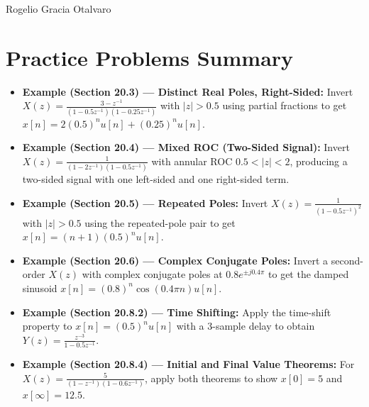 \documentclass[11pt]{article}
\begin{document}
Rogelio Gracia Otalvaro

\section*{Practice Problems Summary}

\begin{itemize}
  \item \textbf{Example (Section 20.3) — Distinct Real Poles, Right-Sided:} Invert $X(z) = \frac{3 - z^{-1}}{(1 - 0.5 z^{-1})(1 - 0.25 z^{-1})}$ with $|z| > 0.5$ using partial fractions to get $x[n] = 2(0.5)^n u[n] + (0.25)^n u[n]$.
  \item \textbf{Example (Section 20.4) — Mixed ROC (Two-Sided Signal):} Invert $X(z) = \frac{1}{(1 - 2 z^{-1})(1 - 0.5 z^{-1})}$ with annular ROC $0.5 < |z| < 2$, producing a two-sided signal with one left-sided and one right-sided term.
  \item \textbf{Example (Section 20.5) — Repeated Poles:} Invert $X(z) = \frac{1}{(1 - 0.5 z^{-1})^2}$ with $|z| > 0.5$ using the repeated-pole pair to get $x[n] = (n+1)(0.5)^n u[n]$.
  \item \textbf{Example (Section 20.6) — Complex Conjugate Poles:} Invert a second-order $X(z)$ with complex conjugate poles at $0.8 e^{\pm j 0.4\pi}$ to get the damped sinusoid $x[n] = (0.8)^n \cos(0.4\pi n) u[n]$.
  \item \textbf{Example (Section 20.8.2) — Time Shifting:} Apply the time-shift property to $x[n] = (0.5)^n u[n]$ with a 3-sample delay to obtain $Y(z) = \frac{z^{-3}}{1 - 0.5 z^{-1}}$.
  \item \textbf{Example (Section 20.8.4) — Initial and Final Value Theorems:} For $X(z) = \frac{5}{(1 - z^{-1})(1 - 0.6 z^{-1})}$, apply both theorems to show $x[0] = 5$ and $x[\infty] = 12.5$.
\end{itemize}
\end{document}

